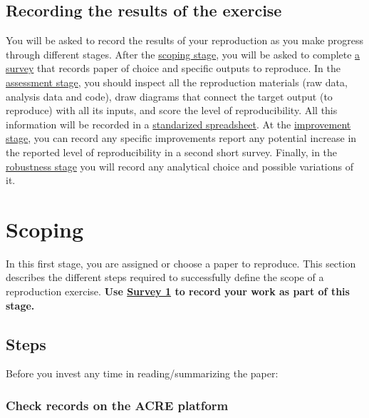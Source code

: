 \documentclass[]{book}
\begin{document}
\hypertarget{recording-the-results-of-the-exercise}{%
\section{Recording the results of the exercise}\label{recording-the-results-of-the-exercise}}

You will be asked to record the results of your reproduction as you make progress through different stages. After the \protect\hyperlink{scoping}{scoping stage}, you will be asked to complete \href{https://berkeley.qualtrics.com/jfe/form/SV_8hLHNI6LGSYchEN}{a survey} that records paper of choice and specific outputs to reproduce. In the \protect\hyperlink{assessment}{assessment stage}, you should inspect all the reproduction materials (raw data, analysis data and code), draw diagrams that connect the target output (to reproduce) with all its inputs, and score the level of reproducibility. All this information will be recorded in a \href{ADD\%20LINK}{standarized spreadsheet}. At the \href{(\#improvements)}{improvement stage}, you can record any specific improvements report any potential increase in the reported level of reproducibility in a second short survey. Finally, in the \protect\hyperlink{robust}{robustness stage} you will record any analytical choice and possible variations of it.

\hypertarget{scoping}{%
\chapter{Scoping}\label{scoping}}

In this first stage, you are assigned or choose a paper to reproduce. This section describes the different steps required to successfully define the scope of a reproduction exercise. \textbf{Use \href{https://berkeley.qualtrics.com/jfe/form/SV_8hLHNI6LGSYchEN}{Survey 1} to record your work as part of this stage.}

\hypertarget{steps}{%
\section{Steps}\label{steps}}

Before you invest any time in reading/summarizing the paper:

\hypertarget{check-acre}{%
\subsection{Check records on the ACRE platform}\label{check-acre}}
\end{document}
